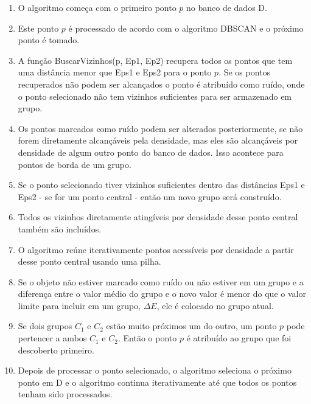\begin{enumerate}
	\item O algoritmo começa com o primeiro ponto ${p}$ no banco de dados D.
	\item Este ponto ${p}$ é processado de acordo com o algoritmo DBSCAN e o próximo ponto é tomado.
	\item A função BuscarVizinhos(p, Ep1, Ep2) recupera todos os pontos que tem uma distância menor que Eps1 e Eps2 para o ponto ${p}$. Se os pontos recuperados não podem ser alcançados o ponto é atribuído como ruído, onde o ponto selecionado não tem vizinhos suficientes para ser armazenado em grupo.
	\item Os pontos marcados como ruído podem ser alterados posteriormente, se não forem diretamente alcançáveis pela densidade, mas eles são alcançáveis por densidade de algum outro ponto do banco de dados. Isso acontece para pontos de borda de um grupo.
	\item Se o ponto selecionado tiver vizinhos suficientes dentro das distâncias Eps1 e Eps2 - se for um ponto central - então um novo grupo será construído.
	\item Todos os vizinhos diretamente atingíveis por densidade desse ponto central também são incluídos.
	\item O algoritmo reúne iterativamente pontos acessíveis por densidade a partir desse ponto central usando uma pilha.
	\item Se o objeto não estiver marcado como ruído ou não estiver em um grupo e a diferença entre o valor médio do grupo e o novo valor é menor do que o valor limite para incluir em um grupo, ${\Delta E}$, ele é colocado no grupo atual.
	\item Se dois grupos ${C_1}$ e ${C_2}$ estão muito próximos um do outro, um ponto ${p}$ pode pertencer a ambos ${C_1}$ e ${C_2}$. Então o ponto ${p}$ é atribuído ao grupo que foi descoberto primeiro.
	\item Depois de processar o ponto selecionado, o algoritmo seleciona o próximo ponto em D e o algoritmo continua iterativamente até que todos os pontos tenham sido processados.
\end{enumerate}

